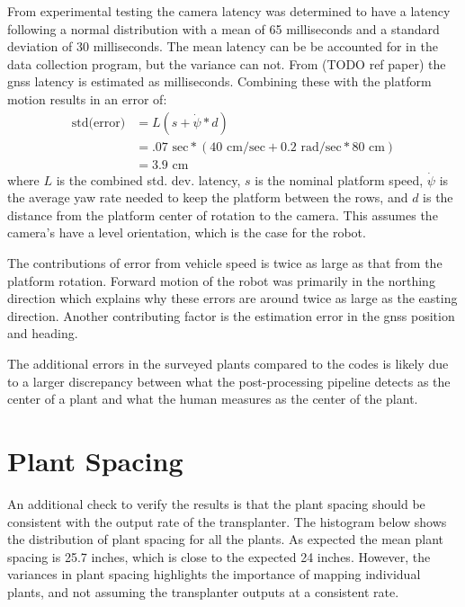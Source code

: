 From experimental testing the camera latency was determined to have a latency following a normal distribution with a mean of 65 milliseconds and a standard deviation of 30 milliseconds.  The mean latency can be be accounted for in the data collection program, but the variance can not. From (TODO ref paper) the \ac{gnss} latency is estimated as {} milliseconds. Combining these with the platform motion results in an error of:
\begin{align*}
 \text{std(error)} &= L (s + \dot{\psi}*d) \\
             &= .07 \text{ sec}* (40\text{ cm/sec} + 0.2 \text{ rad/sec} * 80 \text{ cm}) \\ 
             &= 3.9 \text{ cm}
\end{align*}
where $L$ is the combined std. dev. latency, $s$ is the nominal platform speed, $\dot{\psi}$ is the average yaw rate needed to keep the platform between the rows, and $d$ is the distance from the platform center of rotation to the camera.  This assumes the camera's have a level orientation, which is the case for the robot.

The contributions of error from vehicle speed is twice as large as that from the platform rotation. Forward motion of the robot was primarily in the northing direction which explains why these errors are around twice as large as the easting direction.  Another contributing factor is the estimation error in the \ac{gnss} position and heading.

The additional errors in the surveyed plants compared to the codes is likely due to a larger discrepancy between what the post-processing pipeline detects as the center of a plant and what the human measures as the center of the plant. 

\section{Plant Spacing}

An additional check to verify the results is that the plant spacing should be consistent with the output rate of the transplanter.  The histogram below shows the distribution of plant spacing for all the plants.  As expected the mean plant spacing is 25.7 inches, which is close to the expected 24 inches. However, the variances in plant spacing highlights the importance of mapping individual plants, and not assuming the transplanter outputs at a consistent rate.

